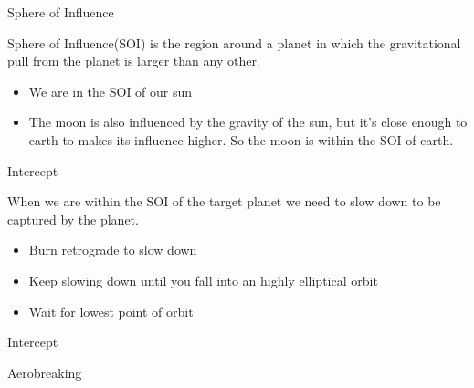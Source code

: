 {
%
\begin{frame}
\end{frame}
\begin{frame}[t]{Sphere of Influence}
    \begin{block}{}
    Sphere of Influence(SOI) is the region around a planet in which the gravitational pull from the planet is larger
    than any other.
    \begin{itemize}
        \item We are in the SOI of our sun
        \item The moon is also influenced by the gravity of the sun, but it's close enough to earth to makes its
            influence higher. So the moon is within the SOI of earth.
    \end{itemize}
    \end{block}
\end{frame}
\begin{frame}[t]{Intercept}
    \begin{block}{}
        When we are within the SOI of the target planet we need to slow down to be captured by the planet.
        \begin{itemize}
            \item Burn retrograde to slow down
            \item Keep slowing down until you fall into an highly elliptical orbit
            \item Wait for lowest point of orbit
        \end{itemize}
    \end{block}
\end{frame}
\begin{frame}[t]{Intercept}
    \begin{block}{Aerobreaking}

\end{block}
\end{frame}}
